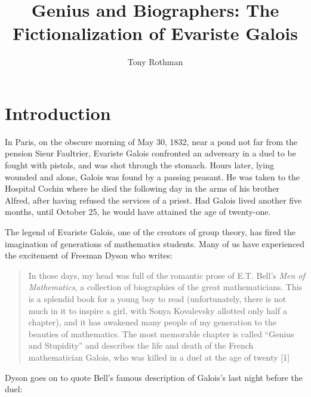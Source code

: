 \documentclass[12pt]{article}
\begin{document}
\title{Genius and Biographers: The Fictionalization of Evariste Galois}
\author{Tony Rothman}
\date{}
\maketitle

\section{Introduction}

In Paris, on the obscure morning of May 30, 1832, near a pond not far from the pension Sieur Faultrier, Evariste Galois confronted an adversary in a duel to be fought with pistols, and was shot through the stomach. Hours later, lying wounded and alone, Galois was found by a passing peasant. He was taken to the Hospital Cochin where he died the following day in the arms of his brother Alfred, after having refused the services of a priest. Had Galois lived another five months, until October 25, he would have attained the age of twenty-one. 

The legend of Evariste Galois, one of the creators of group theory, has fired the imagination of generations of mathematics students. Many of us have experienced the excitement of Freeman Dyson who writes:

\begin{quote}
In those days, my head was full of the romantic prose of E.T. Bell's \emph{Men of Mathematics}, a collection of biographies of the great mathematicians. This is a splendid book for a young boy to read (unfortunately, there is not much in it to inspire a girl, with Sonya Kovalevsky allotted only half a chapter), and it has awakened many people of my generation to the beauties of mathematics. The most memorable chapter is called ``Genius and Stupidity'' and describes the life and death of the French mathematician Galois, who was killed in a duel at the age of twenty [1]
\end{quote}
Dyson goes on to quote Bell's famous description of Galois's last night before the duel:
\end{document}
